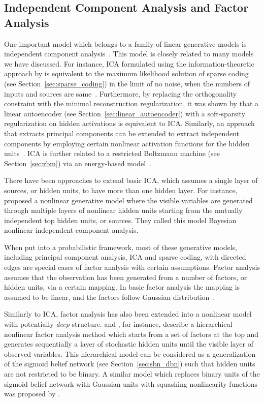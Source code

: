 \documentclass{now}
\begin{document}
\subsection{Independent Component Analysis and Factor Analysis}
\label{sec:ica_fa}

One important model which belongs to a family of linear generative models is
independent component analysis~\citep[ICA, see, e.g.,][]{Hyvarinen2001}. This
model is closely related to many models we have discussed.  For instance, ICA
formulated using the information-theoretic approach by \citet{Bell1995} is
equivalent to the maximum likelihood solution of sparse coding (see
Section~\ref{sec:sparse_coding}) in the limit of no noise, when the numbers of
inputs and sources are same~\citep{Olshausen1997}.  Furthermore, by replacing
the orthogonality constraint with the minimal reconstruction regularization, it
was shown by \citet{Le2011} that a linear autoencoder (see
Section~\ref{sec:linear_autoencoder}) with a soft-sparsity regularization on
hidden activations is equivalent to ICA. Similarly, an approach that extracts
principal components can be extended to extract independent components by
employing certain nonlinear activation functions for the hidden
units~\citep[see, e.g.,][]{Oja1997,Hyvarinen2001}. ICA is further related to a
restricted Boltzmann machine (see Section~\ref{sec:rbm}) via an energy-based
model~\citep{Teh2003}.

There have been approaches to extend basic ICA, which assumes a single layer of
sources, or hidden units, to have more than one hidden layer. For instance,
\citet{Lappalainen2000} proposed a nonlinear generative model where the visible
variables are generated through multiple layers of nonlinear hidden units
starting from the mutually independent top hidden units, or sources. They called
this model Bayesian nonlinear independent component analysis. 

When put into a probabilistic framework, most of these generative models,
including principal component analysis, ICA and sparse coding, with directed
edges are special cases of factor analysis with certain assumptions. Factor
analysis assumes that the observation has been generated from a number of
factors, or hidden units, via a certain mapping.  In basic factor analysis the
mapping is assumed to be linear, and the factors follow Gaussian
distribution~\citep[see, e.g.,][Chapter 12.2.4]{Bishop2006}. 

Similarly to ICA, factor analysis has also been extended into a nonlinear model
with potentially \textit{deep} structure. \citet{Raiko2001} and
\citet{Raiko2007}, for instance, describe a hierarchical nonlinear factor
analysis method which starts from a set of factors at the top and generates
sequentially a layer of stochastic hidden units until the visible layer of
observed variables. This hierarchical model can be considered as a
generalization of the sigmoid belief network (see Section~\ref{sec:sbn_dbn})
such that hidden units are not restricted to be binary. A similar model which
replaces binary units of the sigmoid belief network with Gaussian units with
squashing nonlinearity functions was proposed by \citet{Frey1999}.
\end{document}
